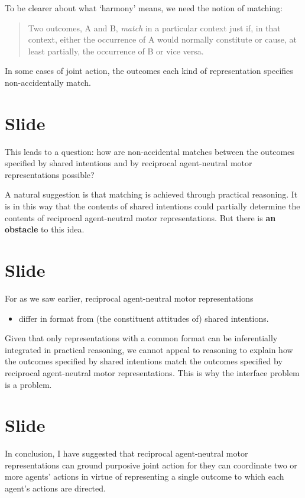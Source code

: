 \documentclass[12pt,\papersize]{extarticle}
\begin{document}
To be clearer about what `harmony' means, we need the notion of matching:
\begin{quote}
Two  outcomes, A and B, \emph{match} in a particular context just if, in that context, either the occurrence of A would normally constitute or cause, at least partially, the occurrence of B or vice versa. 
\end{quote}
In some cases of joint action, the outcomes each kind of representation specifies non-accidentally match.



\section{Slide}
This leads to a question: how are non-accidental matches between the outcomes specified by shared intentions and by reciprocal agent-neutral motor representations possible?

A natural suggestion is that matching is achieved through practical reasoning.
It is in this way that the contents of shared intentions could partially determine the contents of reciprocal agent-neutral motor representations.
But there is \textbf{an obstacle} to this idea.


\section{Slide}
For as we saw earlier, reciprocal agent-neutral motor representations
\begin{itemize}
\item differ in format from (the constituent attitudes of) shared intentions.
\end{itemize}

Given that only representations with a common format can be inferentially integrated in practical reasoning,
we cannot appeal to reasoning to explain how the outcomes specified by shared intentions match the outcomes specified by reciprocal agent-neutral motor representations.
This is why the interface problem is a problem.


\section{Slide}
In conclusion,
I have suggested that 
reciprocal agent-neutral motor representations
can 
ground purposive joint action
for they
can coordinate two or more agents' actions in virtue of representing a single outcome to which each agent's actions are directed.
\end{document}
